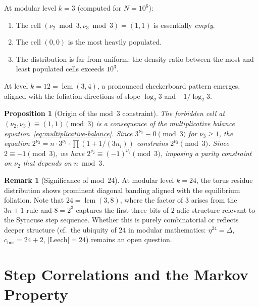 \documentclass[11pt,a4paper]{article}
\DeclareMathOperator{\lcm}{lcm}
\theoremstyle{plain}
\newtheorem{proposition}[theorem]{Proposition}
\theoremstyle{definition}
\newtheorem{remark}[theorem]{Remark}
\begin{document}
\begin{empirical}\label{obs:mod3}
    At modular level $k = 3$ (computed for $N = 10^6$):
    \begin{enumerate}
        \item The cell $(\nu_2 \bmod 3, \nu_3 \bmod 3) = (1, 1)$ is essentially \emph{empty}.
        \item The cell $(0, 0)$ is the most heavily populated.
        \item The distribution is far from uniform: the density ratio between the most and least populated cells exceeds $10^3$.
    \end{enumerate}
    At level $k = 12 = \lcm(3, 4)$, a pronounced checkerboard pattern emerges, aligned with the foliation directions of slope $\log_2 3$ and $-1/\log_2 3$.
\end{empirical}

\begin{proposition}[Origin of the mod~3 constraint]\label{prop:mod3}
    The forbidden cell at $(\nu_2, \nu_3) \equiv (1,1) \pmod{3}$ is a consequence of the multiplicative balance equation~\eqref{eq:multiplicative-balance}. Since $3^{\nu_3} \equiv 0 \pmod{3}$ for $\nu_3 \geq 1$, the equation $2^{\nu_2} = n \cdot 3^{\nu_3} \cdot \prod(1 + 1/(3n_i))$ constrains $2^{\nu_2} \pmod{3}$. Since $2 \equiv -1 \pmod{3}$, we have $2^{\nu_2} \equiv (-1)^{\nu_2} \pmod{3}$, imposing a parity constraint on $\nu_2$ that depends on $n \bmod 3$.
\end{proposition}

\begin{remark}[Significance of mod~24]
    At modular level $k = 24$, the torus residue distribution shows prominent diagonal banding aligned with the equilibrium foliation. Note that $24 = \lcm(3, 8)$, where the factor of $3$ arises from the $3n+1$ rule and $8 = 2^3$ captures the first three bits of $2$-adic structure relevant to the Syracuse step sequence. Whether this is purely combinatorial or reflects deeper structure (cf.\ the ubiquity of $24$ in modular mathematics: $\eta^{24} = \Delta$, $c_{\mathrm{bos}} = 24 + 2$, $|\mathrm{Leech}| = 24$) remains an open question.
\end{remark}


\section{Step Correlations and the Markov Property}\label{sec:correlations}
\end{document}

